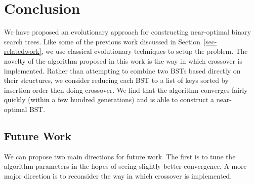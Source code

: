 
\section{Conclusion}

We have proposed an evolutionary approach for constructing near-optimal binary search trees. Like some of the previous work discussed in Section~\ref{sec-relatedwork}, we use classical evolutionary techniques to setup the problem. The novelty of the algorithm proposed in this work is the way in which crossover is implemented. Rather than attempting to combine two BSTs based directly on their structures, we consider reducing each BST to a list of keys sorted by insertion order then doing crossover. We find that the algorithm converges fairly quickly (within a few hundred generations) and is able to construct a near-optimal BST.

\subsection{Future Work}
We can propose two main directions for future work. The first is to tune the algorithm parameters in the hopes of seeing slightly better convergence. A more major direction is to reconsider the way in which crossover is implemented.
